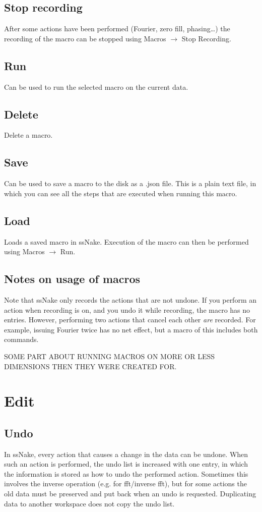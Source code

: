 \documentclass[11pt,a4paper]{article}
\begin{document}
\subsection{Stop recording}
After some actions have been performed (Fourier, zero fill, phasing\ldots   ) the recording of the macro can be stopped using Macros $\rightarrow$ Stop Recording. 

\subsection{Run}
Can be used to run the selected macro on the current data.

\subsection{Delete}
Delete a macro.

\subsection{Save}
Can be used to save a macro to the disk as a .json file. This is a plain text file, in which you can see all the steps that are executed when running this macro.

\subsection{Load}
Loads a saved macro in ssNake. Execution of the macro can then be performed using Macros $\rightarrow$ Run.

\subsection{Notes on usage of macros}
Note that ssNake only records the actions that are not undone. If you perform an action when recording is on, and you undo it while recording, the macro has no entries. However, performing two actions that cancel each other \textit{are} recorded. For example, issuing Fourier twice has no net effect, but a macro of this includes both commands.

SOME PART ABOUT RUNNING MACROS ON MORE OR LESS DIMENSIONS THEN THEY WERE CREATED FOR.




\section{Edit}
\subsection{Undo}
In ssNake, every action that causes a change in the data can be undone. When such an action is performed, the undo list is increased with one entry, in which the information is stored as how to undo the performed action. Sometimes this involves the inverse operation (e.g. for fft/inverse fft), but for some actions the old data must be preserved and put back when an undo is requested. Duplicating data to another workspace does not copy the undo list.
\end{document}
